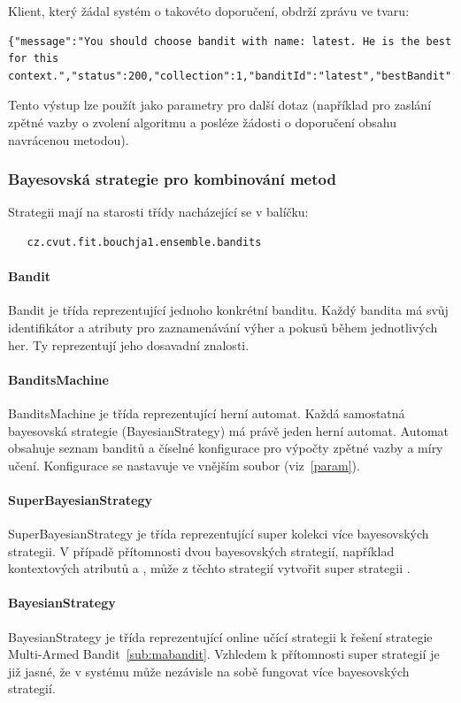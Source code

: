 \documentclass[thesis=M,czech]{FITthesis}[2014/05/07]
\begin{document}
Klient, který žádal systém o takovéto doporučení, obdrží zprávu ve tvaru:

\begin{lstlisting}
{"message":"You should choose bandit with name: latest. He is the best for this context.","status":200,"collection":1,"banditId":"latest","bestBandit":2}
\end{lstlisting}

Tento výstup lze použít jako parametry pro další dotaz (například pro zaslání zpětné vazby o zvolení algoritmu a posléze žádosti o doporučení obsahu navrácenou metodou).

\subsubsection{Bayesovská strategie pro kombinování metod}

Strategii mají na starosti třídy nacházející se v balíčku:

\begin{verbatim}
   cz.cvut.fit.bouchja1.ensemble.bandits
\end{verbatim}

\paragraph{Bandit}
Bandit je třída reprezentující jednoho konkrétní banditu. Každý bandita má svůj identifikátor a atributy pro zaznamenávání výher a pokusů během jednotlivých her. Ty reprezentují jeho dosavadní znalosti.
\paragraph{BanditsMachine}
BanditsMachine je třída reprezentující herní automat. Každá samostatná bayesovská strategie (BayesianStrategy) má právě jeden herní automat. Automat obsahuje seznam banditů a číselné konfigurace pro výpočty zpětné vazby a míry učení. Konfigurace se nastavuje ve vnějším soubor (viz~\ref{param}).
\paragraph{SuperBayesianStrategy} SuperBayesianStrategy je třída reprezentující super kolekci více bayesovských strategii. V případě přítomnosti dvou bayesovských strategií, například kontextových atributů  a , může z těchto strategií vytvořit super strategii .
\paragraph{BayesianStrategy}	BayesianStrategy je třída reprezentující online učící strategii k řešení strategie Multi-Armed Bandit~\ref{sub:mabandit}. Vzhledem k přítomnosti super strategií je již jasné, že v systému může nezávisle na sobě fungovat více bayesovských strategií. 
\end{document}
